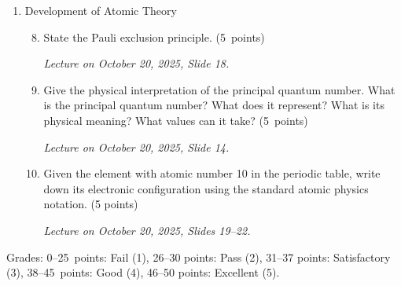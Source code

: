 \documentclass[a4paper,12pt]{letter}
\begin{document}
\begin{enumerate}[label=\Roman*.]
\item Development of Atomic Theory

\begin{enumerate}[label=\arabic*.]
\setcounter{enumii}{7} %
  
\item State the Pauli exclusion principle. \hfill (5~points)

\smallskip
\textit{Lecture on October 20, 2025, Slide 18.}


\item Give the physical interpretation of the principal quantum number. What is the principal quantum number? What does it represent? What is its physical meaning? What values can it take? \hfill (5~points)

\smallskip
\textit{Lecture on October 20, 2025, Slide 14.}

\item Given the element with atomic number 10 in the periodic table, write down its electronic configuration using the standard atomic physics notation. \hfill (5 points)

\smallskip
\textit{Lecture on October 20, 2025, Slides 19--22.}
  
\end{enumerate}

\end{enumerate}


Grades: 0–25~points: Fail (1), 26–30 points: Pass (2), 31–37 points: Satisfactory (3), 38–45~points: Good (4), 46–50 points: Excellent (5).


\vfill
\end{document}
